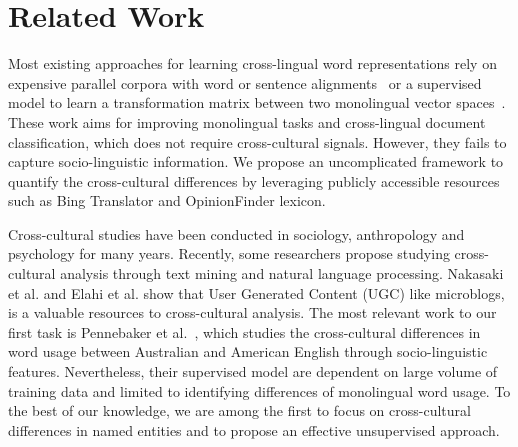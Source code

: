 \section{Related Work}
\label{sec:related}

Most existing approaches for learning cross-lingual word representations  
rely on expensive parallel corpora with word or sentence 
alignments~\cite{Klementiev:2012uk,kovcisky2014learning} or  a 
supervised model to learn a transformation matrix between two monolingual 
vector spaces~\cite{Mikolov:2013tp}. 
These work aims for  improving monolingual tasks and cross-lingual 
document classification, which does not require cross-cultural signals. However, they fails to  capture socio-linguistic information. We propose an uncomplicated framework to quantify the cross-cultural differences by leveraging publicly accessible resources such as Bing Translator and OpinionFinder lexicon.

Cross-cultural studies have been conducted in 
sociology, anthropology and psychology for many years. Recently, some researchers propose 
studying cross-cultural analysis through text mining and natural language processing. 
Nakasaki et al.  and 
Elahi et al.  show that 
User Generated Content (UGC) like microblogs, 
is a valuable resources to cross-cultural analysis. 
The most relevant work to our first task is Pennebaker 
et al.~, which studies the cross-cultural 
differences in word usage between Australian and American English through 
socio-linguistic features. Nevertheless, their supervised model are dependent on large volume of training data and limited to identifying differences of monolingual word usage. To the best of our knowledge, we are among the first to focus on cross-cultural differences in named entities and to propose an effective unsupervised approach.

